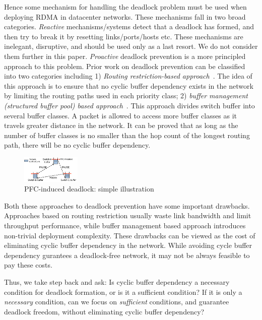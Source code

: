 Hence some mechanism for handling the deadlock problem must be used when
deploying RDMA in datacenter networks.  These mechanisms fall in two broad
categories. {\em Reactive} mechanisms/systems detect that a deadlock has formed,
and then try to break it by resetting links/ports/hosts etc.  These mechanisms
are inelegant, disruptive, and should be used only as a last resort.  We do not
consider them further in this paper.  {\em Proactive} deadlock prevention is a
more principled approach to this problem.  Prior work on deadlock prevention can
be classified into two categories including 1) \textit{Routing restriction-based
approach}~\cite{tcpbolt,flich2012survey}. The idea of this approach is to ensure
that no cyclic buffer dependency exists in the network by limiting the routing
paths used in each priority class;  2) \textit{buffer management (structured
buffer pool) based approach}~\cite{gerla1980flow,karol2003prevention}. This
approach divides switch buffer into several buffer classes. A packet is allowed
to access more buffer classes as it travels greater distance in the network. It
can be proved that as long as the number of buffer classes is no smaller than
the hop count of the longest routing path, there will be no cyclic buffer
dependency.

\begin{figure}
\centering
\includegraphics[width=0.25\textwidth] {figs/deadlock}
\vspace{-0.15in}
\caption{PFC-induced deadlock: simple illustration}
\vspace{-0.25in}
\label{fig:deadlock_example}
\end{figure}

Both these approaches to deadlock prevention have some important drawbacks.
Approaches based on routing restriction usually waste link bandwidth and limit
throughput performance, while buffer management based approach introduces
non-trivial deployment complexity. These drawbacks can be viewed as the cost of
eliminating cyclic buffer dependency in the network. While avoiding cycle buffer
dependency gurantees a deadlock-free network, it may not be always feasible to
pay these costs.

Thus, we take step back and ask: Is cyclic buffer dependency a
necessary condition for deadlock formation, or is it a sufficient condition? If
it is only a {\em necessary} condition, can we focus on {\em sufficient}
conditions, and guarantee deadlock freedom, without  eliminating cyclic buffer
dependency?

